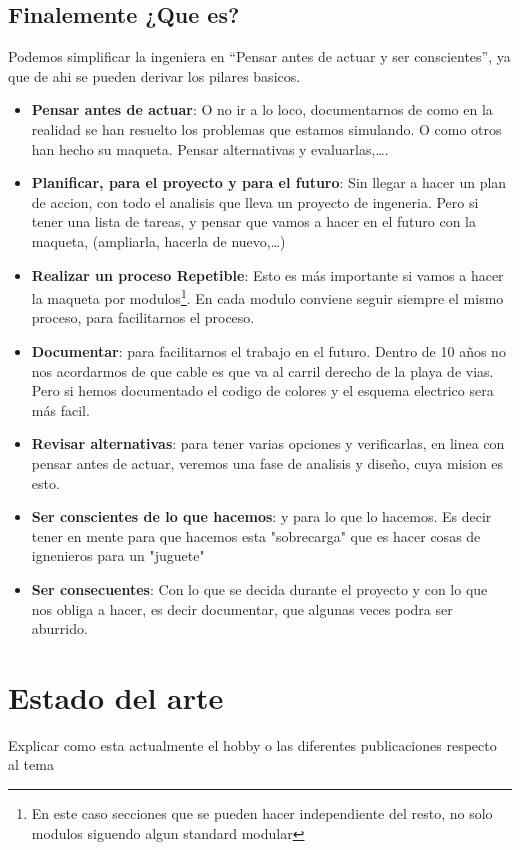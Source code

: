 \subsection{Finalemente ¿Que es?}
Podemos simplificar la ingeniera en ``Pensar antes de actuar y ser conscientes'', ya que de ahi
se pueden derivar los pilares basicos.
\begin{itemize}
    \item \textbf{Pensar antes de actuar}: O no ir a lo loco, documentarnos de como en la
          realidad se han resuelto los problemas que estamos simulando. O como otros han hecho su maqueta.
          Pensar alternativas y evaluarlas,\dots.
    \item \textbf{Planificar, para el proyecto y para el futuro}: Sin llegar a hacer un plan de
          accion, con todo el analisis que lleva un proyecto de ingeneria. Pero si tener una lista de
          tareas, y pensar que vamos a hacer en el futuro con la maqueta, (ampliarla, hacerla de nuevo,\dots)
    \item \textbf{Realizar un proceso Repetible}: Esto es más importante si vamos a hacer la
          maqueta por modulos\footnote{En este caso secciones que se pueden hacer independiente del resto,
              no solo modulos siguendo algun standard modular}. En cada modulo conviene seguir siempre el mismo
          proceso, para facilitarnos el proceso.
    \item \textbf{Documentar}: para facilitarnos el trabajo en el futuro. Dentro de 10 años no
          nos acordarmos de que cable es que va al carril derecho de la playa de vias. Pero si hemos
          documentado el codigo de colores y el esquema electrico sera más facil.
    \item \textbf{Revisar alternativas}: para tener varias opciones y verificarlas, en linea con
          pensar antes de actuar, veremos una fase de analisis y diseño, cuya mision es esto.
    \item \textbf{Ser conscientes de lo que hacemos}: y para lo que lo hacemos. Es decir tener
          en mente para que hacemos esta "sobrecarga" que es hacer cosas de ignenieros para un "juguete"
    \item \textbf{Ser consecuentes}: Con lo que se decida durante el proyecto y con lo que nos
          obliga a hacer, es decir documentar, que algunas veces podra ser aburrido.
\end{itemize}


\section{Estado del arte}
Explicar como esta actualmente el hobby o las diferentes publicaciones respecto al tema

